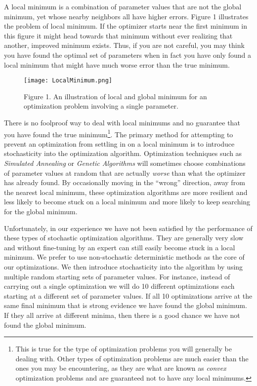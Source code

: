 \documentclass[]{memoir}
\let\Oldincludegraphics\includegraphics
\renewcommand{\includegraphics}[1]{\Oldincludegraphics[max size={\textwidth}{\textheight}]{#1}}
\begin{document}
A local minimum is a combination of parameter values that are not the
global minimum, yet whose nearby neighbors all have higher errors.
Figure 1 illustrates the problem of local minimum. If the optimizer
starts near the first minimum in this figure it might head towards that
minimum without ever realizing that another, improved minimum exists.
Thus, if you are not careful, you may think you have found the optimal
set of parameters when in fact you have only found a local minimum that
might have much worse error than the true minimum.

\begin{figure}[htbp]
\centering
\texttt{[image: LocalMinimum.png]}
\caption{Figure 1. An illustration of local and global minimum for an
optimization problem involving a single parameter.}
\end{figure}

There is no foolproof way to deal with local minimums and no guarantee
that you have found the true minimum\footnote{This is true for the type
  of optimization problems you will generally be dealing with. Other
  types of optimization problems are much easier than the ones you may
  be encountering, as they are what are known as \emph{convex}
  optimization problems and are guaranteed not to have any local
  minimums.}. The primary method for attempting to prevent an
optimization from settling in on a local minimum is to introduce
stochasticity into the optimization algorithm. Optimization techniques
such as \emph{Simulated Annealing} or \emph{Genetic Algorithms} will
sometimes choose combinations of parameter values at random that are
actually \emph{worse} than what the optimizer has already found. By
occasionally moving in the ``wrong'' direction, away from the nearest
local minimum, these optimization algorithms are more resilient and less
likely to become stuck on a local minimum and more likely to keep
searching for the global minimum.

Unfortunately, in our experience we have not been satisfied by the
performance of these types of stochastic optimization algorithms. They
are generally very slow and without fine-tuning by an expert can still
easily become stuck in a local minimum. We prefer to use non-stochastic
deterministic methods as the core of our optimizations. We then
introduce stochasticity into the algorithm by using multiple random
starting sets of parameter values. For instance, instead of carrying out
a single optimization we will do 10 different optimizations each
starting at a different set of parameter values. If all 10 optimizations
arrive at the same final minimum that is strong evidence we have found
the global minimum. If they all arrive at different minima, then there
is a good chance we have not found the global minimum.
\end{document}

